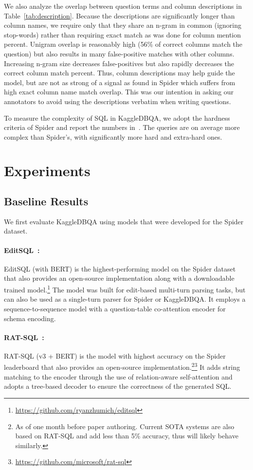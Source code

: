 \documentclass[11pt,a4paper]{article}
\newcommand{\systemname}{\mbox{KaggleDBQA}\xspace}
\begin{document}
We also analyze the overlap between question terms and column descriptions in Table~\ref{tab:description}.
Because the descriptions are significantly longer than column names, we require only that they share an n-gram in common
(ignoring stop-words) rather than requiring exact match as was done for column mention percent.
Unigram overlap is reasonably high (56\% of correct columns match the question) but also results in many false-positive
matches with other columns.
Increasing n-gram size decreases false-positives but also rapidly decreases the correct column match percent.
Thus, column descriptions may help guide the model, but are not as strong of a signal as found in Spider which suffers
from high exact column name match overlap.
This was our intention in asking our annotators to avoid using the descriptions verbatim when writing questions.

To measure the complexity of SQL in \systemname, we adopt the hardness criteria of Spider and report the
numbers in~.
The queries are on average more complex than Spider's, with significantly more hard and extra-hard ones.
 \section{Experiments}
\label{sec:evaluation}


\subsection{Baseline Results}
We first evaluate \systemname using models that were developed for the Spider dataset.

\paragraph{EditSQL~\cite{editsql}:}
EditSQL (with BERT) is the highest-performing model on the Spider dataset that also provides an open-source
implementation along with a downloadable trained model.\footnote{\url{https://github.com/ryanzhumich/editsql}}
The model was built for edit-based multi-turn parsing tasks, but can also be used as a single-turn parser for Spider
or \systemname.
It employs a sequence-to-sequence model with a question-table co-attention encoder for schema encoding.

\paragraph{RAT-SQL~\cite{wang-etal-2020-rat}:}
RAT-SQL (v3 + BERT) is the model with highest accuracy on the Spider leaderboard that also provides an open-source
implementation.\footnote{As of one month before paper authoring.
Current SOTA systems are also based on RAT-SQL and add less than 5\% accuracy, thus will likely behave similarly.}\footnote{\url{https://github.com/microsoft/rat-sql}}
It adds string matching to the encoder through the use of relation-aware self-attention and adopts a tree-based decoder
to ensure the correctness of the generated SQL.
\end{document}
